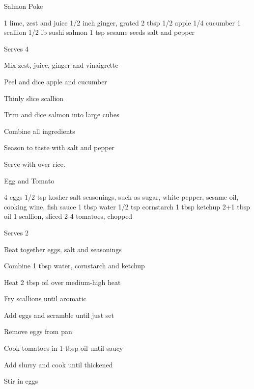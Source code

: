 
\begin{recipe}{Salmon Poke}{}
\begin{ingredients}
1 lime, zest and juice
1/2 inch ginger, grated
2 tbsp 
1/2 apple
1/4 cucumber
1 scallion
1/2 lb sushi salmon
1 tsp sesame seeds
salt and pepper
\end{ingredients}
\nextcolumn
Serves 4
\begin{steps}
    \item Mix zest, juice, ginger and vinaigrette
    \item Peel and dice apple and cucumber
    \item Thinly slice scallion
    \item Trim and dice salmon into large cubes
    \item Combine all ingredients
    \item Season to taste with salt and pepper
\end{steps}
Serve with  over rice.
\end{recipe}

\begin{denserecipe}{Egg and Tomato}{}
\begin{ingredients}
4 eggs
1/2 tsp kosher salt
seasonings, such as sugar, white pepper, sesame oil, cooking wine, fish sauce
1 tbsp water
1/2 tsp cornstarch
1 tbsp ketchup
2+1 tbsp oil
1 scallion, sliced
2-4 tomatoes, chopped
\end{ingredients}
\nextcolumn
Serves 2
\begin{steps}
    \item Beat together eggs, salt and seasonings
    \item Combine 1 tbsp water, cornstarch and ketchup
    \item Heat 2 tbsp oil over medium-high heat
    \item Fry scallions until aromatic
    \item Add eggs and scramble until just set
    \item Remove eggs from pan
    \item Cook tomatoes in 1 tbsp oil until saucy
    \item Add slurry and cook until thickened
    \item Stir in eggs
\end{steps}
\end{denserecipe}

